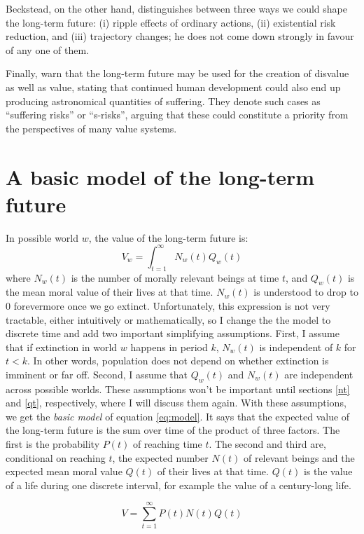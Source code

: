 \documentclass[british]{article}
\begin{document}
Beckstead, on the other hand, distinguishes between three ways we could shape the long-term future: (i)
ripple effects of ordinary actions, (ii) existential risk reduction, and
(iii) trajectory changes; he does not come down strongly in favour of any one of them.

Finally, \cite{althaus_reducing_2016} warn that the long-term future may be used for the creation of disvalue as well as value, stating that continued human development could also end up producing astronomical quantities of suffering. They denote such cases as ``suffering risks'' or ``s-risks'', arguing that these could constitute a priority from the perspectives of many value systems.

\section{A basic model of the long-term future}\label{sec:basicmodel}
In possible world $w$, the value of the long-term future is:
$$V_w = \int_{t=1}^\infty N_w(t)Q_w(t)$$
where $N_w(t)$ is the number of morally relevant beings at time $t$, and $Q_w(t)$ is the mean moral value of their lives at that time. $N_w(t)$ is understood to drop to 0 forevermore once we go extinct. Unfortunately, this expression is not very tractable, either intuitively or mathematically, so I change the the model to discrete time and add two important simplifying assumptions. First, I assume that if extinction in world $w$ happens in period $k$, $N_w(t)$ is independent of $k$ for $t<k$. In other words, population does not depend on whether extinction is imminent or far off. Second, I assume that $Q_w(t)$ and $N_w(t)$ are independent across possible worlds. These assumptions won't be important until sections \ref{nt} and \ref{qt}, respectively, where I will discuss them again. With these assumptions, we get the \emph{basic model} of equation \ref{eq:model}. It says that the expected value of the long-term future is the sum over time of the product of three factors. The first is the probability $P(t)$ of reaching time \(t\). The second and third are, conditional on reaching $t$, the expected number $N(t)$ of relevant beings and the expected mean moral value $Q(t)$ of their lives at that time. $Q(t)$ is the value of a life during one discrete interval, for example the value of a century-long life.

\begin{equation}
V=\sum_{t=1}^\infty P(t) N(t)Q(t) \label{eq:model}
\end{equation}
\end{document}
